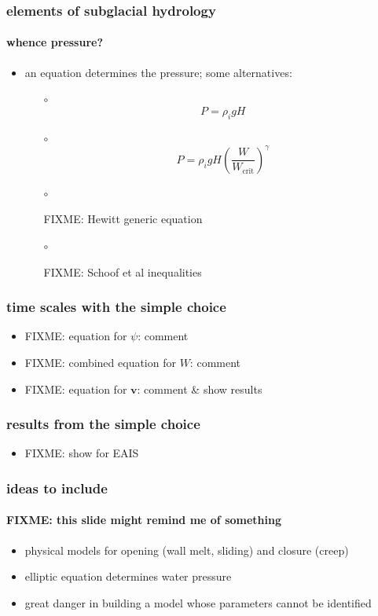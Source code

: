 \documentclass[hide notes,intlimits]{beamer}
\begin{document}
\begin{frame}
  \frametitle{elements of subglacial hydrology}
  \framesubtitle{whence pressure?}

  \begin{itemize}
    \item an equation determines the pressure; some alternatives:
      \begin{itemize}
      \item[$\circ$]
        $$P = \rho_i g H$$
      \item[$\circ$]
        $$P = \rho_i g H \left(\frac{W}{W_{\text{crit}}}\right)^\gamma$$
      \item[$\circ$]
        
        FIXME: Hewitt generic equation
      \item[$\circ$]
        
        FIXME: Schoof et al inequalities
      \end{itemize}
  \end{itemize}

\end{frame}


\begin{frame}
  \frametitle{time scales with the simple choice}

  \begin{itemize}
    \item FIXME: equation for $\psi$: comment
    \item FIXME: combined equation for $W$: comment
    \item FIXME: equation for $\mathbf{v}$: comment \& show results
  \end{itemize}

\end{frame}


\begin{frame}
  \frametitle{results from the simple choice}

  \begin{itemize}
    \item FIXME: show for EAIS
  \end{itemize}

\end{frame}











\begin{frame}
  \frametitle{ideas to include}
  \framesubtitle{FIXME: this slide might remind me of something}

  \begin{itemize}
  \item physical models for opening (wall melt, sliding) and closure (creep)
  \item elliptic equation determines water pressure
  \item \alert{great danger} in building a model whose parameters cannot be identified
  \end{itemize}
\end{frame}
\end{document}
